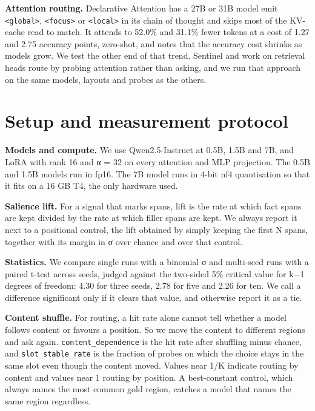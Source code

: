 \documentclass[10pt]{article}
\begin{document}
\textbf{Attention routing.} Declarative Attention \citep{ho2026attention} has a 27B or 31B model emit \texttt{\textless{}global\textgreater{}},
\texttt{\textless{}focus\textgreater{}} or \texttt{\textless{}local\textgreater{}} in its chain of thought and skips most of the KV-cache read to match.
It attends to 52.0\% and 31.1\% fewer tokens at a cost of 1.27 and 2.75 accuracy points,
zero-shot, and notes that the accuracy cost shrinks as models grow. We test the other end of
that trend. Sentinel \citep{zhang2025sentinel} and work on retrieval heads \citep{wu2024retrieval} route by probing attention rather
than asking, and we run that approach on the same models, layouts and probes as the others.

\section{Setup and measurement protocol}

\textbf{Models and compute.} We use Qwen2.5-Instruct \citep{qwen2024qwen25} at 0.5B, 1.5B and 7B, and LoRA \citep{hu2021lora}
with rank 16 and α = 32 on every attention and MLP projection. The 0.5B and 1.5B models run
in fp16. The 7B model runs in 4-bit nf4 quantisation so that it fits on a 16 GB T4, the only
hardware used.

\textbf{Salience lift.} For a signal that marks spans, lift is the rate at which fact spans are
kept divided by the rate at which filler spans are kept. We always report it next to a
positional control, the lift obtained by simply keeping the first N spans, together with its
margin in σ over chance and over that control.

\textbf{Statistics.} We compare single runs with a binomial σ and multi-seed runs with a
paired t-test across seeds, judged against the two-sided 5\% critical value for k−1 degrees
of freedom: 4.30 for three seeds, 2.78 for five and 2.26 for ten. We call a difference significant only if
it clears that value, and otherwise report it as a tie.

\textbf{Content shuffle.} For routing, a hit rate alone cannot tell whether a model follows
content or favours a position. So we move the content to different regions and ask again.
\texttt{content\_dependence} is the hit rate after shuffling minus chance, and \texttt{slot\_stable\_rate} is
the fraction of probes on which the choice stays in the same slot even though the content
moved. Values near 1/K indicate routing by content and values near 1 routing by position. A
best-constant control, which always names the most common gold region, catches a model that
names the same region regardless.
\end{document}
